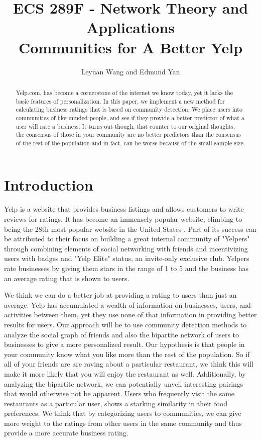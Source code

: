 \documentclass[10pt]{article}
\title{ECS 289F - Network Theory and Applications\\ Communities for A Better Yelp }
\author{Leyuan Wang and Edmund Yan}
\begin{document}
\maketitle
\begin{abstract}
Yelp.com, has become a cornerstone of the internet we know today, yet it lacks the basic features of personalization.  In this paper, we implement a new method for calculating business ratings that is based on community detection.  We place users into communities of like-minded people, and see if they provide a better predictor of what a user will rate a business.  It turns out though, that counter to our original thoughts, the consensus of those in your community are no better predictors than the consensus of the rest of the population and in fact, can be worse because of the small sample size.
\end{abstract}


\section{Introduction}

Yelp is a website that provides business listings and allows customers to write reviews for ratings.  It has become an immensely popular website, climbing to being the 28th most popular website in the United States \cite{AlexaYelp}.  Part of its success can be attributed to their focus on building a great internal community of "Yelpers" through combining elements of social networking with friends and incentivizing users with badges and "Yelp Elite" status, an invite-only exclusive club.  Yelpers rate businesses by giving them stars in the range of 1 to 5 and the business has an average rating that is shown to users.

We think we can do a better job at providing a rating to users than just an average.  Yelp has accumulated a wealth of information on businesses, users, and activities between them, yet they use none of that information in providing better results for users.  Our approach will be to use community detection methods to analyze the social graph of friends and also the bipartite network of users to businesses to give a more personalized result.  Our hypothesis is that people in your community know what you like more than the rest of the population.  So if all of your friends are are raving about a particular restaurant, we think this will make it more likely that you will enjoy the restaurant as well.  Additionally, by analyzing the bipartite network, we can potentially unveil interesting pairings that would otherwise not be apparent.  Users who frequently visit the same restaurants as a particular user, shows a starking similarity in their food preferences.  We think that by categorizing users to communities, we can give more weight to the ratings from other users in the same community and thus provide a more accurate business rating.
\end{document}
